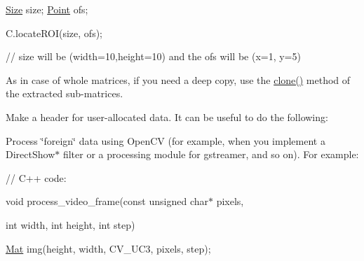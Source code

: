 {\ttfamily }

{\ttfamily }

{\ttfamily \mbox{\hyperlink{classorg_1_1opencv_1_1core_1_1_size}{Size}} size; \mbox{\hyperlink{classorg_1_1opencv_1_1core_1_1_point}{Point}} ofs;}

{\ttfamily }

{\ttfamily }

{\ttfamily C.\+locate\+R\+O\+I(size, ofs);}

{\ttfamily }

{\ttfamily }

{\ttfamily // size will be (width=10,height=10) and the ofs will be (x=1, y=5)}

{\ttfamily }

{\ttfamily }

{\ttfamily }

As in case of whole matrices, if you need a deep copy, use the {\ttfamily \mbox{\hyperlink{classorg_1_1opencv_1_1core_1_1_mat_a7e40ecb438d2ec75e24e209b7bee0be2}{clone()}}} method of the extracted sub-\/matrices.


\begin{DoxyItemize}
\item Make a header for user-\/allocated data. It can be useful to do the following\+: 
\item Process \char`\"{}foreign\char`\"{} data using Open\+CV (for example, when you implement a Direct\+Show$\ast$ filter or a processing module for {\ttfamily gstreamer}, and so on). For example\+: 
\end{DoxyItemize}

{\ttfamily }

{\ttfamily }

{\ttfamily }

{\ttfamily // C++ code\+:}

{\ttfamily }

{\ttfamily }

{\ttfamily void process\+\_\+video\+\_\+frame(const unsigned char$\ast$ pixels,}

{\ttfamily }

{\ttfamily }

{\ttfamily int width, int height, int step)}

{\ttfamily }

{\ttfamily }

{\ttfamily \mbox{\hyperlink{classorg_1_1opencv_1_1core_1_1_mat}{Mat}} img(height, width, C\+V\+\_\+U\+C3, pixels, step);}

{\ttfamily }

